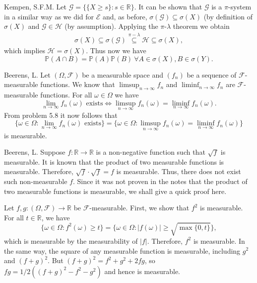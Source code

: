\begin{solution}[5.3]{Kempen, S.F.M.}
    \noindent Let $\mathcal{G} = \{\{X\geq s\}: s\in \mathbb{R}\}$. It can be shown that $\mathcal{G}$ is a $\pi$-system in a similar way as we did for $\mathcal{E}$ and, as before, $\sigma(\mathcal{G}) \subseteq \sigma(X)$ (by definition of $\sigma(X)$ and $\mathcal{G} \in \mathcal{H}$ (by assumption). Applying the $\pi$-$\lambda$ theorem we obtain
    \begin{align*}
        \sigma(X) \subseteq \sigma(\mathcal{G}) \stackrel{\pi-\lambda}{\subseteq} \mathcal{H} \subseteq \sigma(X),
    \end{align*}
    which implies $\mathcal{H} = \sigma(X)$. Thus now we have
    $$ \mathbb{P}(A\cap B) = \mathbb{P}(A)\mathbb{P}(B) \ \forall A\in \sigma(X), B\in \sigma(Y).  $$

\end{solution}

\begin{solution}[5.9]{Beerens, L.}
    Let $(\Omega, \mathcal{F})$ be a measurable space and $(f_n)$ be a sequence of $\mathcal{F}$-measurable functions. 
    We know that $\limsup_{n\rightarrow\infty}f_n$ and $\liminf_{n\rightarrow\infty}f_n$ are $\mathcal{F}$-measurable functions. For all $\omega\in\Omega$ we have 
    $$
        \lim_{n\rightarrow\infty}f_n(\omega) \text{ exists} \iff \limsup_{n\rightarrow\infty}f_n(\omega)=\liminf_{n\rightarrow\infty}f_n(\omega).
    $$
    From problem 5.8 it now follows that
    $$
        \{\omega \in \Omega : \lim_{n\rightarrow\infty}f_n(\omega) \text{ exists}\} = \{\omega \in \Omega :\limsup_{n\rightarrow\infty}f_n(\omega)=\liminf_{n\rightarrow\infty}f_n(\omega) \}
    $$
    is measurable.
\end{solution}

\begin{solution}[5.19]{Beerens, L.}
    Suppose $f:\mathbb{R}\rightarrow\mathbb{R}$ is a non-negative function such that $\sqrt{f}$ is measurable. It is known that the product of two measurable functions is measurable. Therefore, $\sqrt{f}\cdot\sqrt{f}=f$ is measurable. Thus, there does not exist such non-measurable $f$. Since it was not proven in the notes that the product of two measurable functions is measurable, we shall give a quick proof here. 
    
    Let $f,g:(\Omega,\mathcal{F})\rightarrow \mathbb{R}$ be $\mathcal{F}$-measurable. First, we show that $f^2$ is measurable. For all $t\in\mathbb{R}$, we have
    $$
        \{ \omega\in\Omega:f^2(\omega)\geq t \} = \{ \omega\in\Omega:|f(\omega)|\geq\sqrt{\max\{0,t\}} \},
    $$
    which is measurable by the measurability of $|f|$. Therefore, $f^2$ is measurable. In the same way, the square of any measurable function is measurable, including $g^2$ and $(f+g)^2$. But $(f+g)^2 = f^2 + g^2 +2fg$, so $fg = 1/2 ((f+g)^2 - f^2 - g^2)$ and hence is measurable.
\end{solution}

